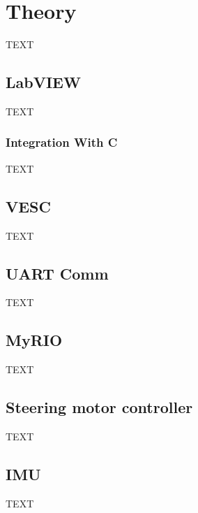 \chapter{Theory}

TEXT

\section{LabVIEW}
TEXT

\subsection{Integration With C}
TEXT

\section{VESC}
TEXT

\section{UART Comm}
TEXT

\section{MyRIO}
TEXT

\section{Steering motor controller}
TEXT

\section{IMU}
TEXT
